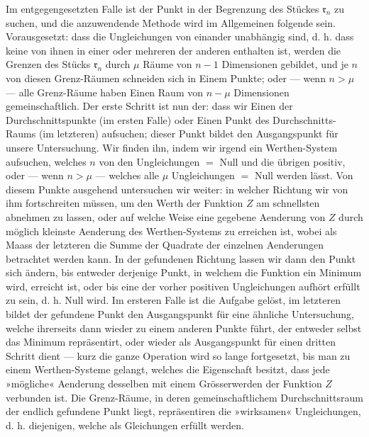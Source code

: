 \indent Im entgegengesetzten Falle ist der Punkt in der Begrenzung des Stückes \(\mathfrak{r}_n\) zu suchen, und die anzuwendende Methode wird im Allgemeinen folgende sein. Vorausgesetzt: dass die Ungleichungen von einander unabhängig sind, d. h. dass keine von ihnen in einer oder mehreren der anderen enthalten ist, werden die Grenzen des Stücks \(\mathfrak{r}_n\) durch \(\mu\) Räume von \(n-1\) Dimensionen gebildet, und je \(n\) von diesen Grenz-Räumen schneiden sich in Einem Punkte; oder — wenn \(n>\mu\) — alle Grenz-Räume haben Einen Raum von \(n-\mu\) Dimensionen gemeinschaftlich. Der erste Schritt ist nun der: dass wir Einen der Durchschnittspunkte (im ersten Falle) oder Einen Punkt des Durchschnitts-Raums (im letzteren) aufsuchen; dieser Punkt bildet den Ausgangspunkt für unsere Untersuchung. Wir finden ihn, indem wir irgend ein Werthen-System aufsuchen, welches \(n\) von den Ungleichungen \(=\) Null und die übrigen positiv, oder — wenn \(n>\mu\) — welches alle \(\mu\) Ungleichungen \(=\) Null werden lässt. Von diesem Punkte ausgehend untersuchen wir weiter: in welcher Richtung wir von ihm fortschreiten müssen, um den Werth der Funktion \(Z\) am schnellsten abnehmen zu lassen, oder auf welche Weise eine gegebene Aenderung von \(Z\) durch möglich kleinste Aenderung des Werthen-Systems zu erreichen ist, wobei als Maass der letzteren die Summe der Quadrate der einzelnen Aenderungen betrachtet werden kann. In der gefundenen Richtung lassen wir dann den Punkt sich ändern, bis entweder derjenige Punkt, in welchem die Funktion ein Minimum wird, erreicht ist, oder bis eine der vorher positiven Ungleichungen aufhört erfüllt zu sein, d. h. Null wird. Im ersteren Falle ist die Aufgabe gelöst, im letzteren bildet der gefundene Punkt den Ausgangspunkt für eine ähnliche Untersuchung, welche ihrerseits dann wieder zu einem anderen Punkte führt, der entweder selbst das Minimum repräsentirt, oder wieder als Ausgangspunkt für einen dritten Schritt dient — kurz die ganze Operation wird so lange fortgesetzt, bis man zu einem Werthen-Systeme gelangt, welches die Eigenschaft besitzt, dass jede »mögliche« Aenderung desselben mit einem Grösserwerden der Funktion \(Z\) verbunden ist. Die Grenz-Räume, in deren gemeinschaftlichem Durchschnittsraum der endlich gefundene Punkt liegt, repräsentiren die »wirksamen« Ungleichungen, d. h. diejenigen, welche als Gleichungen erfüllt werden.
\clearpage{}

